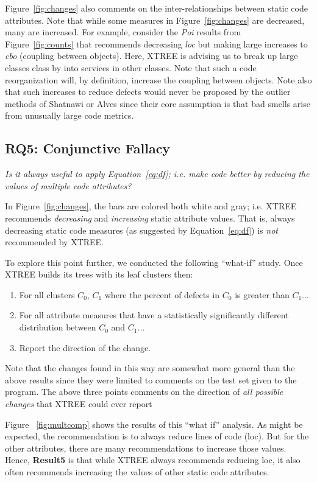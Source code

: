 \documentclass[twocolumn,5p]{elsarticle}
\newcommand{\be}{\begin{enumerate}}
\newcommand{\ee}{\end{enumerate}}
\newcommand{\fig}[1]{Figure~\ref{fig:#1}}
\newcommand{\eq}[1]{Equation~\ref{eq:#1}}
\theoremstyle{break}
\begin{document}
\begin{itemize}
		\fig{changes} also comments on the inter-relationships between static code attributes. Note that while some measures in
		\fig{changes} are decreased, many are increased.  
		For example, consider the {\em Poi} results
		from \fig{counts} that recommends decreasing {\em loc}
		but making large increases to {\em cbo} (coupling between
		objects). Here, XTREE is advising us to break up
		large classes class by into services
		in other classes. Note that such a code reorganization will, by
		definition, increase the coupling between objects. 
		Note also that such increases  to reduce
		defects would never be proposed by the outlier methods
		of Shatnawi or Alves since their core assumption is that bad
		smells arise from unusually large code metrics.
		
		\subsection{RQ5: Conjunctive Fallacy}
		
		{\em  Is  it  always  useful  to  apply \eq{df};  i.e.   make  code  better  by  reducing  the  values  of multiple code attributes?}
		
		In  \fig{changes}, the bars are colored both white and gray; i.e. XTREE recommends {\em decreasing} and {\em increasing} 
		static attribute values. That is, always decreasing static code measures (as suggested by \eq{df}) is {\em not} recommended by XTREE.
		
		To explore this point further, we conducted the following ``what-if'' study. Once XTREE builds its trees with its leaf clusters then:
		\be
		\item For all clusters $C_0$, $C_1$ where the percent of defects in $C_0$ is greater than $C_1$...
		\item For all attribute measures that have a statistically significantly different distribution  between $C_0$ and $C_1$...
		\item Report the direction of the change.
		\ee
		Note that the changes found in this way are somewhat more general than the above results
		since they were  limited
		to comments on the test set given to the program. The above three points comments on the direction of {\em all possible changes}
		that XTREE could ever report
		
		
		Figure ~\ref{fig:multcomp} shows the results of this ``what if'' analysis. As might be expected, the recommendation is to
		always reduce lines of code (loc). But for the other attributes, there are many recommendations to increase those values.
		Hence, {\bf Result5} is that while XTREE always  recommends reducing loc,
		it also   often recommends increasing the values of other static code attributes.   
		


\end{itemize}
\end{document}
